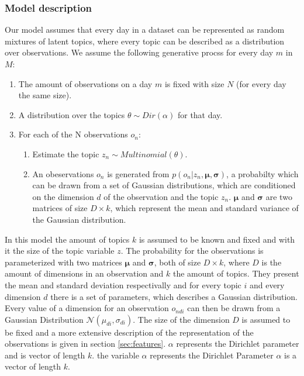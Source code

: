 \documentclass[11pt,a4paper]{article}
\begin{document}
  \subsubsection{Model description}
  
  Our model assumes that every day in a dataset can be represented as random mixtures of latent topics, where every topic can be described as a distribution over observations. We assume the following generative procss for every day $m$ in $M$:
\begin{enumerate}
 \item The amount of observations on a day $m$ is fixed with size $N$ (for every day the same size).
 \item A distribution over the topics $\theta \sim Dir(\alpha)$ for that day.
 \item For each of the N observations $o_n$:
 
 \begin{enumerate}
  \item Estimate the topic $z_n \sim Multinomial(\theta)$.
  \item An obeservations $o_n$ is generated from $p(o_n |z_n,\boldsymbol\mu,\boldsymbol\sigma)$, a probabilty which can be drawn from a set of Gaussian distributions, which are conditioned on the dimension $d$ of the observation and the topic $z_n$. $\boldsymbol\mu$ and $\boldsymbol\sigma$ are two matrices of size  $D\times k$, which represent the mean and standard variance of the Gaussian distribution.
 \end{enumerate}

\end{enumerate}
  
In this model the amount of topics $k$ is assumed to be known and fixed and with it the size of the topic variable $z$.
The probability for the observations is parameterized with two matrices $\boldsymbol\mu$ and $\boldsymbol\sigma$, both of size $D\times k$, where $D$ is the amount of dimensions in an observation and $k$ the amount of topics. They present the mean and standard deviation respectivally and for every topic $i$ and every dimension $d$ there is a set of parameters, which describes a Gaussian distribution.  Every value of a dimension for an observation $o_{ndi}$ can then be drawn from a Gaussian Distribution $\mathcal{N}(\mu_{di},\sigma_{di})$.
The size of the dimension $D$ is assumed to be fixed and a more extensive description of the representation of the observations is given in section \ref{sec:features}. $\alpha$ represents the Dirichlet parameter and is vector of length $k$.
the variable $\alpha$ represents the Dirichlet Parameter
$\alpha$ is a vector of length $k$.
\end{document}
